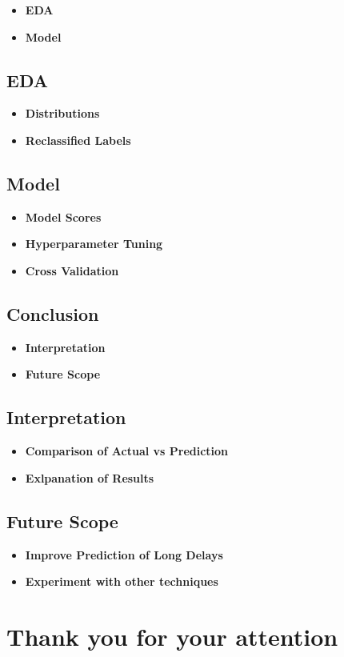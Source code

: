\documentclass[
  letterpaper,
  DIV=11,
  numbers=noendperiod]{scrartcl}
\providecommand{\tightlist}{%
  \setlength{\itemsep}{0pt}\setlength{\parskip}{0pt}}\usepackage{longtable,booktabs,array}
\begin{document}
\begin{itemize}
\tightlist
\item
  \textbf{EDA}
\item
  \textbf{Model}
\end{itemize}

\subsection{EDA}\label{eda}

\begin{itemize}
\tightlist
\item
  \textbf{Distributions}
\item
  \textbf{Reclassified Labels}
\end{itemize}

\subsection{Model}\label{model}

\begin{itemize}
\tightlist
\item
  \textbf{Model Scores}
\item
  \textbf{Hyperparameter Tuning}
\item
  \textbf{Cross Validation}
\end{itemize}

\subsection{Conclusion}\label{conclusion}

\begin{itemize}
\tightlist
\item
  \textbf{Interpretation}
\item
  \textbf{Future Scope}
\end{itemize}

\subsection{Interpretation}\label{interpretation}

\begin{itemize}
\tightlist
\item
  \textbf{Comparison of Actual vs Prediction}
\item
  \textbf{Exlpanation of Results}
\end{itemize}

\subsection{Future Scope}\label{future-scope}

\begin{itemize}
\tightlist
\item
  \textbf{Improve Prediction of Long Delays}
\item
  \textbf{Experiment with other techniques}
\end{itemize}

\section{Thank you for your
attention}\label{thank-you-for-your-attention}
\end{document}
